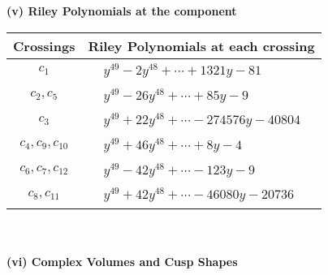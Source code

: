 \documentclass[1p]{elsarticle_modified}
\theoremstyle{definition}
\begin{document}
\newpage\renewcommand{\arraystretch}{1}
\flushleft \textbf{(v) Riley Polynomials at the component}\newline \\
\begin{tabular}{m{50pt}|m{274pt}}
Crossings & \hspace{64pt}Riley Polynomials at each crossing \\
\hline $$\begin{aligned}c_{1}\end{aligned}$$&$\begin{aligned}
&y^{49}-2 y^{48}+\cdots+1321 y-81
\end{aligned}$\\
\hline $$\begin{aligned}c_{2},c_{5}\end{aligned}$$&$\begin{aligned}
&y^{49}-26 y^{48}+\cdots+85 y-9
\end{aligned}$\\
\hline $$\begin{aligned}c_{3}\end{aligned}$$&$\begin{aligned}
&y^{49}+22 y^{48}+\cdots-274576 y-40804
\end{aligned}$\\
\hline $$\begin{aligned}c_{4},c_{9},c_{10}\end{aligned}$$&$\begin{aligned}
&y^{49}+46 y^{48}+\cdots+8 y-4
\end{aligned}$\\
\hline $$\begin{aligned}c_{6},c_{7},c_{12}\end{aligned}$$&$\begin{aligned}
&y^{49}-42 y^{48}+\cdots-123 y-9
\end{aligned}$\\
\hline $$\begin{aligned}c_{8},c_{11}\end{aligned}$$&$\begin{aligned}
&y^{49}+42 y^{48}+\cdots-46080 y-20736
\end{aligned}$\\
\hline
\end{tabular}\\~\\
\newpage\flushleft \textbf{(vi) Complex Volumes and Cusp Shapes}
\end{document}
